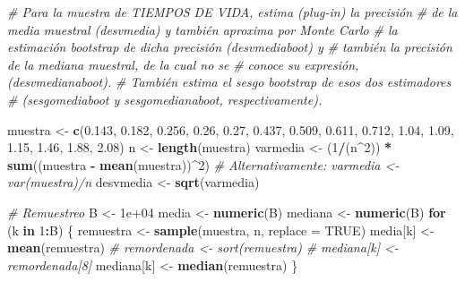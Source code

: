 \documentclass[]{book}
\newenvironment{Shaded}{\begin{snugshade}}{\end{snugshade}}
\newcommand{\KeywordTok}[1]{\textcolor[rgb]{0.13,0.29,0.53}{\textbf{#1}}}
\newcommand{\DataTypeTok}[1]{\textcolor[rgb]{0.13,0.29,0.53}{#1}}
\newcommand{\DecValTok}[1]{\textcolor[rgb]{0.00,0.00,0.81}{#1}}
\newcommand{\FloatTok}[1]{\textcolor[rgb]{0.00,0.00,0.81}{#1}}
\newcommand{\StringTok}[1]{\textcolor[rgb]{0.31,0.60,0.02}{#1}}
\newcommand{\CommentTok}[1]{\textcolor[rgb]{0.56,0.35,0.01}{\textit{#1}}}
\newcommand{\OtherTok}[1]{\textcolor[rgb]{0.56,0.35,0.01}{#1}}
\newcommand{\ControlFlowTok}[1]{\textcolor[rgb]{0.13,0.29,0.53}{\textbf{#1}}}
\newcommand{\OperatorTok}[1]{\textcolor[rgb]{0.81,0.36,0.00}{\textbf{#1}}}
\newcommand{\NormalTok}[1]{#1}
\theoremstyle{definition}
\theoremstyle{definition}
\theoremstyle{definition}
\theoremstyle{remark}
\begin{document}
\begin{Shaded}
\begin{Highlighting}[]
\CommentTok{# Para la muestra de TIEMPOS DE VIDA, estima (plug-in) la precisión }
\CommentTok{# de la media muestral (desvmedia) y también aproxima por Monte Carlo}
\CommentTok{# la estimación bootstrap de dicha precisión (desvmediaboot) y}
\CommentTok{# también la precisión de la mediana muestral, de la cual no se}
\CommentTok{# conoce su expresión, (desvmedianaboot).}
\CommentTok{# También estima el sesgo bootstrap de esos dos estimadores }
\CommentTok{# (sesgomediaboot y sesgomedianaboot, respectivamente).}

\NormalTok{muestra <-}\StringTok{ }\KeywordTok{c}\NormalTok{(}\FloatTok{0.143}\NormalTok{, }\FloatTok{0.182}\NormalTok{, }\FloatTok{0.256}\NormalTok{, }\FloatTok{0.26}\NormalTok{, }\FloatTok{0.27}\NormalTok{, }\FloatTok{0.437}\NormalTok{, }\FloatTok{0.509}\NormalTok{,}
    \FloatTok{0.611}\NormalTok{, }\FloatTok{0.712}\NormalTok{, }\FloatTok{1.04}\NormalTok{, }\FloatTok{1.09}\NormalTok{, }\FloatTok{1.15}\NormalTok{, }\FloatTok{1.46}\NormalTok{, }\FloatTok{1.88}\NormalTok{, }\FloatTok{2.08}\NormalTok{)}
\NormalTok{n <-}\StringTok{ }\KeywordTok{length}\NormalTok{(muestra)}
\NormalTok{varmedia <-}\StringTok{ }\NormalTok{(}\DecValTok{1}\OperatorTok{/}\NormalTok{(n}\OperatorTok{^}\DecValTok{2}\NormalTok{)) }\OperatorTok{*}\StringTok{ }\KeywordTok{sum}\NormalTok{((muestra }\OperatorTok{-}\StringTok{ }\KeywordTok{mean}\NormalTok{(muestra))}\OperatorTok{^}\DecValTok{2}\NormalTok{)}
\CommentTok{# Alternativamente: varmedia <- var(muestra)/n}
\NormalTok{desvmedia <-}\StringTok{ }\KeywordTok{sqrt}\NormalTok{(varmedia)}

\CommentTok{# Remuestreo}
\NormalTok{B <-}\StringTok{ }\FloatTok{1e+04}
\NormalTok{media <-}\StringTok{ }\KeywordTok{numeric}\NormalTok{(B)}
\NormalTok{mediana <-}\StringTok{ }\KeywordTok{numeric}\NormalTok{(B)}
\ControlFlowTok{for}\NormalTok{ (k }\ControlFlowTok{in} \DecValTok{1}\OperatorTok{:}\NormalTok{B) \{}
\NormalTok{    remuestra <-}\StringTok{ }\KeywordTok{sample}\NormalTok{(muestra, n, }\DataTypeTok{replace =} \OtherTok{TRUE}\NormalTok{)}
\NormalTok{    media[k] <-}\StringTok{ }\KeywordTok{mean}\NormalTok{(remuestra)}
    \CommentTok{# remordenada <- sort(remuestra)}
    \CommentTok{# mediana[k] <- remordenada[8]}
\NormalTok{    mediana[k] <-}\StringTok{ }\KeywordTok{median}\NormalTok{(remuestra)}
\NormalTok{\}}


\end{Highlighting}
\end{Shaded}
\end{document}
